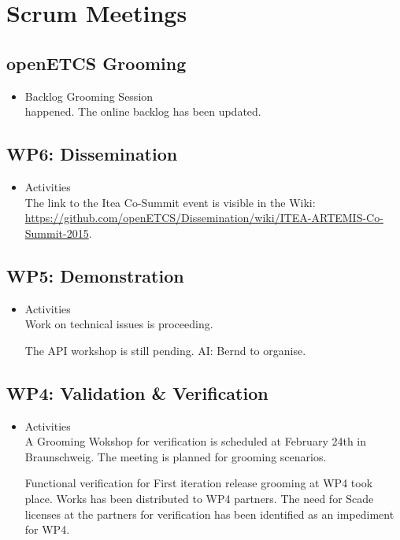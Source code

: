 \documentclass[a4paper, 11pt]{article}
\begin{document}
\section{Scrum Meetings}

\subsection{openETCS Grooming}
\begin{itemize}
\item Backlog Grooming Session\\
happened. The online backlog has been updated.
\end{itemize}

\subsection{WP6: Dissemination}
\begin{itemize}
\item Activities\\
The link to the Itea Co-Summit event is visible in the Wiki:
\url{https://github.com/openETCS/Dissemination/wiki/ITEA-ARTEMIS-Co-Summit-2015}.\\

\end{itemize}

\subsection{WP5: Demonstration}
\begin{itemize}
\item Activities\\
Work on technical issues is proceeding.

The API workshop is still pending. AI: Bernd to organise.

\end{itemize}

\subsection{WP4: Validation \& Verification}
\begin{itemize}
\item Activities\\
A Grooming Wokshop for verification is scheduled at February 24th in Braunschweig. The meeting is planned for grooming scenarios. 

Functional verification for First iteration release grooming at WP4 took place. Works has been distributed to WP4 partners.  The need for Scade licenses at the partners for verification  has been identified as an impediment for WP4.

\end{itemize}
\end{document}
